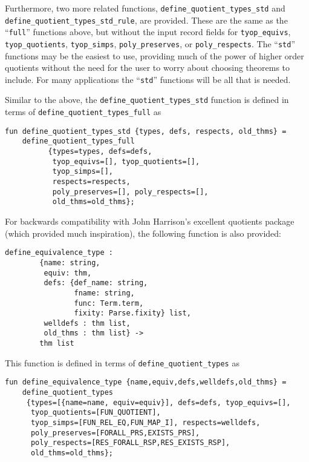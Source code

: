 \documentclass[envcountsame,runningheads]{llncs}
\begin{document}
Furthermore, two more related functions,
{\tt define\_quotient\_types\_std} and
{\tt define\_quotient\_types\_std\_rule},
are provided.
These are the same as the ``{\tt full}'' functions above, but
without the input record fields for 
{\tt tyop\_equivs},
{\tt tyop\_quotients},
{\tt tyop\_simps},
{\tt poly\_preserves}, or
{\tt poly\_respects}.
The ``{\tt std}'' functions may be the easiest to use, providing much of the
power of higher order quotients without the need for the user
to worry about choosing theorems to include. 
For many applications the ``{\tt std}'' functions will be all that is needed.

Similar to the above,
the {\tt define\_quotient\_types\_std} function
is defined in terms of {\tt define\_quotient\_types\_full} as

\begin{verbatim}
fun define_quotient_types_std {types, defs, respects, old_thms} =
    define_quotient_types_full
          {types=types, defs=defs,
           tyop_equivs=[], tyop_quotients=[],
           tyop_simps=[],
           respects=respects,
           poly_preserves=[], poly_respects=[],
           old_thms=old_thms};
\end{verbatim}

For backwards compatibility with John Harrison's excellent quotients package \cite{Har98}
(which provided much inspiration),
the following function is also provided:

\begin{verbatim}
define_equivalence_type : 
        {name: string,
         equiv: thm,
         defs: {def_name: string,
                fname: string,
                func: Term.term,
                fixity: Parse.fixity} list,
         welldefs : thm list,
         old_thms : thm list} ->
        thm list
\end{verbatim}

\noindent
This function is defined in terms of {\tt define\_quotient\_types} as

\begin{verbatim}
fun define_equivalence_type {name,equiv,defs,welldefs,old_thms} =
    define_quotient_types
     {types=[{name=name, equiv=equiv}], defs=defs, tyop_equivs=[],
      tyop_quotients=[FUN_QUOTIENT],
      tyop_simps=[FUN_REL_EQ,FUN_MAP_I], respects=welldefs,
      poly_preserves=[FORALL_PRS,EXISTS_PRS],
      poly_respects=[RES_FORALL_RSP,RES_EXISTS_RSP],
      old_thms=old_thms};
\end{verbatim}
\end{document}
